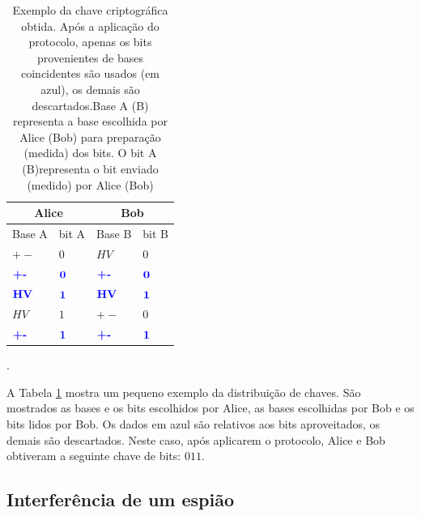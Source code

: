 \documentclass[pra, twocolumn]{revtex4}
\begin{document}
\begin{table}[H]
\centering
  \begin{tabular}{|p{1.9cm}|p{1.6cm}|p{1.7cm}|p{1.4cm}|} 
   \hline
  
 \multicolumn{2}{|c|}{Alice}&\multicolumn{2}{|c|}{Bob}\\
   \hline
     Base A  & bit A & Base B & bit B \\
   \hline

   $+-$ & $0 $ &  $HV$ & $0$  \\ \hline
      $\textcolor{blue}{\textbf{\textbf{+-}}}$ & $\textcolor{blue}{\textbf{\textbf{0}}}$ & $\textcolor{blue}{\textbf{\textbf{+-}}}$ & $\textcolor{blue}{\textbf{\textbf{0}}}$  \\ \hline
      $\textcolor{blue}{\textbf{HV}}$ & $\textcolor{blue}{\textbf{\textbf{1}}}$ & $\textcolor{blue}{\textbf{HV}}$ & $\textcolor{blue}{\textbf{1}}$  \\ \hline
      $HV$ & $1$ & $+-$ & $0$  \\ \hline
      $\textcolor{blue}{\textbf{\textbf{+-}}}$ & $\textcolor{blue}{\textbf{\textbf{1}}}$ & $\textcolor{blue}{\textbf{\textbf{+-}}}$ & $\textcolor{blue}{\textbf{\textbf{1}}}$  \\ \hline
         \end{tabular}
    \caption{Exemplo da chave criptogr\'afica obtida. Ap\'os a aplica\c c\~ao do protocolo, apenas os bits provenientes de bases coincidentes s\~ao usados (em azul), os demais s\~ao descartados.Base A (B) representa a base escolhida por Alice (Bob) para prepara\c c\~ao (medida) dos bits. O bit A (B)representa o bit enviado (medido) por Alice (Bob)}.
              \label{Tabela1}
      \end{table} 	
      
      
      A Tabela \ref{Tabela1} mostra um pequeno exemplo da distribui\c c\~ao de chaves. S\~ao mostrados as bases e os bits escolhidos por Alice, as bases escolhidas por Bob e os bits lidos por Bob. Os dados em azul s\~ao relativos aos bits aproveitados, os demais s\~ao descartados. Neste caso, ap\'os aplicarem o protocolo, Alice e Bob obtiveram a seguinte chave de bits: $011$.
      
      
      

\subsection{Interfer\^encia de um espi\~ao}
\label{spy}
\end{document}
